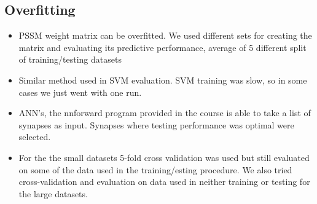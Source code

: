 \documentclass[presentation]{beamer}   %
\begin{document}
\subsection{Overfitting}
\begin{frame}
  \begin{itemize}
    \item<1> PSSM weight matrix can be overfitted. We used different sets for creating the matrix and evaluating its predictive performance, average of 5 different split of training/testing datasets
    \item<2> Similar method used in SVM evaluation. SVM training was slow, so in some cases we just went with one run.
    \item<3> ANN's, the nnforward program provided in the course is able to take a list of synapses as input. Synapses where testing performance was optimal were selected.
    \item<4> For the the small datasets 5-fold cross validation was used but still evaluated on some of the data used in the training/esting procedure. We also tried cross-validation and evaluation on data used in neither training or testing for the large datasets.
  \end{itemize}
\end{frame}
\end{document}
